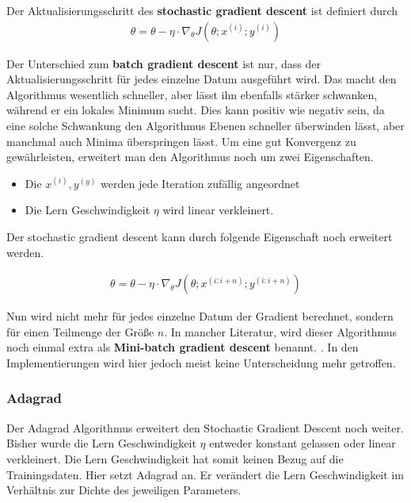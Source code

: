 \begin{definition}
    \cite[Kapitel 2.2]{Ruder.9152016}
    Der Aktualisierungsschritt des \textbf{stochastic gradient descent} ist definiert durch 
    \begin{align}
        \theta = \theta - \eta \cdot \nabla_\theta J(\theta;x^{(i)};y^{(i)})
    \end{align}
\end{definition}

Der Unterschied zum \textbf{batch gradient descent} ist nur, dass der Aktualisierungsschritt
für jedes einzelne Datum ausgeführt wird. Das macht den 
Algorithmus wesentlich schneller, aber lässt ihn ebenfalls 
stärker schwanken, während er ein lokales Minimum sucht. Dies kann
positiv wie negativ sein, da eine solche Schwankung 
den Algorithmus Ebenen schneller überwinden lässt, aber manchmal
auch Minima überspringen lässt. Um eine gut Konvergenz zu gewährleisten,
erweitert man den Algorithmus noch um zwei Eigenschaften.

\begin{itemize}
    \item Die $x^{(i)}, y^{(y)}$ werden jede Iteration zufällig angeordnet
    \item Die Lern Geschwindigkeit $\eta$ wird linear verkleinert. 
\end{itemize}

Der stochastic gradient descent kann durch folgende Eigenschaft noch 
erweitert werden.

\begin{align}
    \theta = \theta - \eta \cdot \nabla_\theta J(\theta;x^{(i:i+n)};y^{(i:i+n)})
\end{align}

Nun wird nicht mehr für jedes einzelne Datum der Gradient berechnet, sondern
für einen Teilmenge der Größe $n$. In mancher Literatur, wird 
dieser Algorithmus noch einmal extra als \textbf{Mini-batch gradient descent} benannt.
\cite[Kapitel 2.3]{Ruder.9152016}. In den Implementierungen wird hier jedoch meist 
keine Unterscheidung mehr getroffen. \cite{FrancoisChollet.}

\subsubsection{Adagrad}\label{Adagrad}

Der Adagrad Algorithmus erweitert den Stochastic Gradient Descent noch weiter.
Bisher wurde die Lern Geschwindigkeit $\eta$ entweder konstant gelassen oder linear verkleinert.
Die Lern Geschwindigkeit hat somit keinen Bezug auf die Trainingsdaten. Hier setzt Adagrad an.
Er verändert die Lern Geschwindigkeit im Verhältnis zur Dichte des jeweiligen Parameters.

